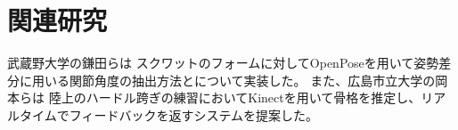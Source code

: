 \chapter{関連研究}
\label{related_reserch}

武蔵野大学の鎌田らは \cite{Relatedresearch1}スクワットのフォームに対してOpenPoseを用いて姿勢差分に用いる関節角度の抽出方法とについて実装した。
また、広島市立大学の岡本らは \cite{Relatedresearch2}陸上のハードル跨ぎの練習においてKinectを用いて骨格を推定し、リアルタイムでフィードバックを返すシステムを提案した。